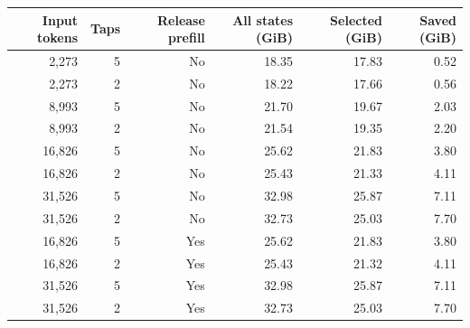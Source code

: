 \begin{tabular}{rrrrrr}
\toprule
Input tokens & Taps & Release prefill & All states (GiB) & Selected (GiB) & Saved (GiB) \\
\midrule
2,273 & 5 & No & 18.35 & 17.83 & 0.52 \\
2,273 & 2 & No & 18.22 & 17.66 & 0.56 \\
8,993 & 5 & No & 21.70 & 19.67 & 2.03 \\
8,993 & 2 & No & 21.54 & 19.35 & 2.20 \\
16,826 & 5 & No & 25.62 & 21.83 & 3.80 \\
16,826 & 2 & No & 25.43 & 21.33 & 4.11 \\
31,526 & 5 & No & 32.98 & 25.87 & 7.11 \\
31,526 & 2 & No & 32.73 & 25.03 & 7.70 \\
16,826 & 5 & Yes & 25.62 & 21.83 & 3.80 \\
16,826 & 2 & Yes & 25.43 & 21.32 & 4.11 \\
31,526 & 5 & Yes & 32.98 & 25.87 & 7.11 \\
31,526 & 2 & Yes & 32.73 & 25.03 & 7.70 \\
\bottomrule
\end{tabular}
